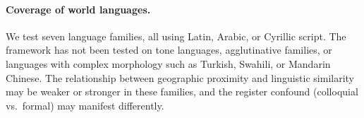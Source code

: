\documentclass[11pt]{article}
\begin{document}
\paragraph{Coverage of world languages.}
We test seven language families, all using Latin, Arabic, or Cyrillic script.
The framework has not been tested on tone languages, agglutinative families, or languages with complex morphology such as Turkish, Swahili, or Mandarin Chinese.
The relationship between geographic proximity and linguistic similarity may be weaker or stronger in these families, and the register confound (colloquial vs.\ formal) may manifest differently.
\end{document}
